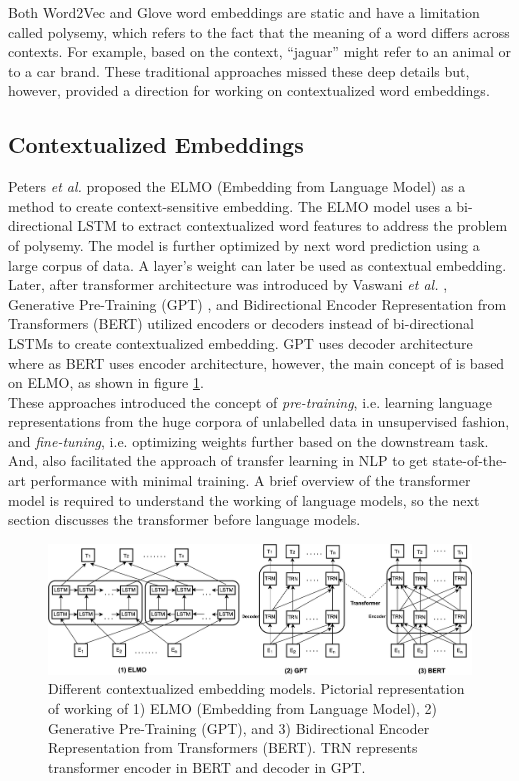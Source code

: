 \documentclass[%
	BCOR=8mm, %
	DIV=12,
	toc=bibliography, %
	toc=listof, %
	oneside, %
	egregdoesnotlikesansseriftitles, %
	]{scrbook}
\begin{document}
 Both Word2Vec and Glove word embeddings are static and have a limitation called polysemy, which refers to the fact that the meaning of a word differs across contexts. For example, based on the context, ``jaguar'' might refer to an animal or to a car brand. These traditional approaches missed these deep details but, however, provided a direction for working on contextualized word embeddings.

 \subsection{Contextualized Embeddings}
 \label{subsection:contextembeddings}
 Peters \textit{et al.} \cite{peters_deep_2018-3} proposed the ELMO (Embedding from Language Model) as a method to create context-sensitive embedding. The ELMO model uses a bi-directional LSTM to extract contextualized word features to address the problem of polysemy. The model is further optimized by next word prediction using a large corpus of data. A layer's weight can later be used as contextual embedding. \\
 Later, after transformer architecture was introduced by  Vaswani \textit{et al.} \cite{vaswani_attention_2017}, Generative Pre-Training (GPT) \cite{radford_improving_2018-1}, and Bidirectional Encoder Representation from Transformers (BERT) \cite{devlin_bert_2019-1} utilized  encoders or decoders instead of bi-directional LSTMs to create contextualized embedding. GPT uses decoder architecture where as BERT uses encoder architecture, however, the main concept of is based on ELMO, as shown in figure \ref{fig:elmo}. \\
These approaches introduced the concept of \textit{pre-training}, i.e. learning language representations from the huge corpora of unlabelled data in unsupervised fashion, and \textit{fine-tuning}, i.e. optimizing weights further based on the downstream task. And, also facilitated the approach of transfer learning in NLP to get state-of-the-art performance with minimal training. A brief overview of the transformer model is required to understand the working of language models, so the next section discusses the transformer before language models.
\begin{figure}[h!]
    \centering
    \includegraphics[width=1.0\linewidth]{img/elmo}
    \caption[Different contextualized embedding models.]{Different contextualized embedding models. Pictorial representation of working of 1) ELMO (Embedding from Language Model),  2) Generative Pre-Training (GPT), and 3) Bidirectional Encoder Representation from Transformers (BERT). TRN represents transformer encoder in BERT and decoder in GPT.}
    \label{fig:elmo}
\end{figure}
\end{document}
